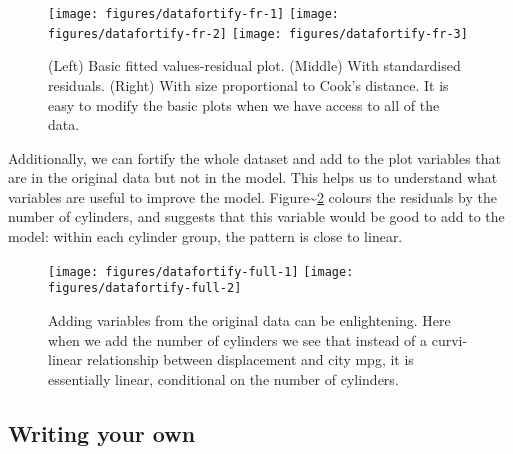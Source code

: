 \begin{figure}

{\centering \texttt{[image: figures/datafortify-fr-1]} \texttt{[image: figures/datafortify-fr-2]} \texttt{[image: figures/datafortify-fr-3]} 

}

\caption{(Left) Basic fitted values-residual plot. (Middle) With standardised residuals. (Right) With size proportional to Cook's distance. It is easy to modify the basic plots when we have access to all of the data.\label{fig:fortify-fr}}
\end{figure}

Additionally, we can fortify the whole dataset and add to the plot
variables that are in the original data but not in the model. This helps
us to understand what variables are useful to improve the model.
Figure\textasciitilde{}\ref{fig:fortify-full} colours the residuals by
the number of cylinders, and suggests that this variable would be good
to add to the model: within each cylinder group, the pattern is close to
linear.

\begin{Shaded}
\end{Shaded}

\begin{figure}

{\centering \texttt{[image: figures/datafortify-full-1]} \texttt{[image: figures/datafortify-full-2]} 

}

\caption{Adding variables from the original data can be enlightening. Here when we add the number of cylinders we see that instead of a curvi-linear relationship between displacement and city mpg, it is essentially linear, conditional on the number of cylinders.\label{fig:fortify-full}}
\end{figure}

\subsection{Writing your own}

